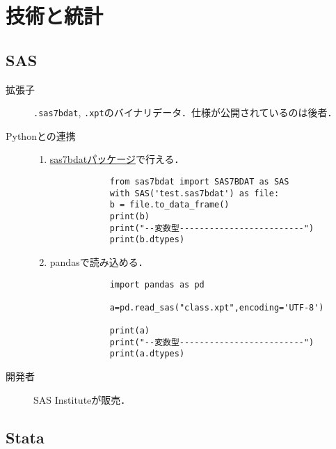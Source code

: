 \documentclass[uplatex,dvipdfmx]{jsreport}
\begin{document}
\section{技術と統計}

\subsection{SAS}

\begin{description}
    \item[拡張子] \texttt{.sas7bdat}, \texttt{.xpt}のバイナリデータ．仕様が公開されているのは後者．
    \item[Pythonとの連携] 
    \begin{enumerate}
        \item \href{https://pypi.org/project/sas7bdat/}{sas7bdatパッケージ}で行える．
        \begin{lstlisting}
            from sas7bdat import SAS7BDAT as SAS
            with SAS('test.sas7bdat') as file:
            b = file.to_data_frame()
            print(b)
            print("--変数型-------------------------")
            print(b.dtypes)
        \end{lstlisting}
        \item pandasで読み込める．
        \begin{lstlisting}
            import pandas as pd
    
            a=pd.read_sas("class.xpt",encoding='UTF-8')
    
            print(a)
            print("--変数型-------------------------")
            print(a.dtypes)
        \end{lstlisting}
    \end{enumerate}
    \item[開発者] SAS Instituteが販売．
\end{description}

\subsection{Stata}
\end{document}
